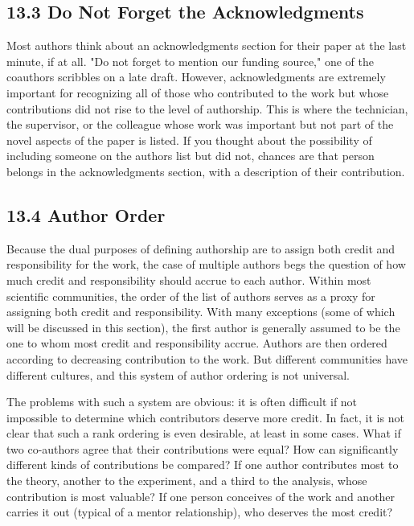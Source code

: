 \subsection*{13.3 Do Not Forget the Acknowledgments}
Most authors think about an acknowledgments section for their paper at the last minute, if at all. "Do not forget to mention our funding source," one of the coauthors scribbles on a late draft. However, acknowledgments are extremely important for recognizing all of those who contributed to the work but whose contributions did not rise to the level of authorship. This is where the technician, the supervisor, or the colleague whose work was important but not part of the novel aspects of the paper is listed. If you thought about the possibility of including someone on the authors list but did not, chances are that person belongs in the acknowledgments section, with a description of their contribution.

\subsection*{13.4 Author Order}
Because the dual purposes of defining authorship are to assign both credit and responsibility for the work, the case of multiple authors begs the question of how much credit and responsibility should accrue to each author. Within most scientific communities, the order of the list of authors serves as a proxy for assigning both credit and responsibility. With many exceptions (some of which will be discussed in this section), the first author is generally assumed to be the one to whom most credit and responsibility accrue. Authors are then ordered according to decreasing contribution to the work. But different communities have different cultures, and this system of author ordering is not universal.

The problems with such a system are obvious: it is often difficult if not impossible to determine which contributors deserve more credit. In fact, it is not clear that such a rank ordering is even desirable, at least in some cases. What if two co-authors agree that their contributions were equal? How can significantly different kinds of contributions be compared? If one author contributes most to the theory, another to the experiment, and a third to the analysis, whose contribution is most valuable? If one person conceives of the work and another carries it out (typical of a mentor relationship), who deserves the most credit?

